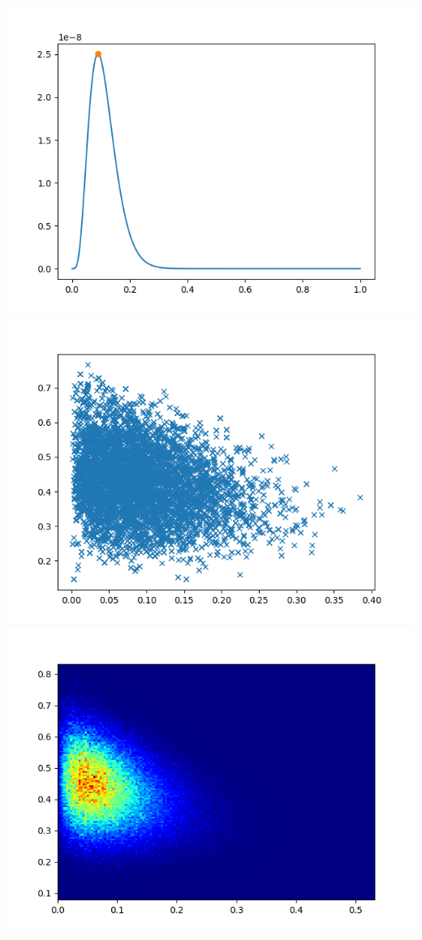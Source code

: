 \documentclass[pt12]{article}
\begin{document}
\newpage

\begin{center}
\includegraphics[scale=0.5]{hip8.png}\\
\includegraphics[scale=0.5]{sc8.png}\\
\includegraphics[scale=0.5]{den8.png}\\
\end{center}
\end{document}
